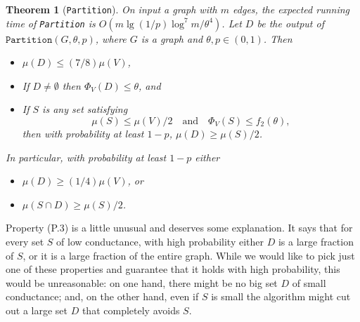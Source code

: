 \documentclass[11pt]{article}
\newtheorem{theorem}{Theorem}[section]
\def\intersect{\cap}
\def\intersect{\cap}
\def\conduc#1#2{\Phi_{#1}\left(#2  \right)}
\def\vol#1{\mu \left(#1  \right)}
\begin{document}
\begin{theorem}[\texttt{Partition}]\label{thm:Partition}
On input a graph with $m$ edges,
  the expected running time of \mbox{\rm \texttt{Partition}} is 
  $O \left(m \lg (1/p) \log^{7} m / \theta^{4} \right) $.
Let $D$ be the output of $\mathtt{Partition} (G, \theta , p)$,
  where $G$ is a graph and $\theta, p \in (0,1)$.
Then
\begin{itemize}
\item [(P.1)] $\vol{D} \leq (7/8) \vol{V}$,
\item [(P.2)] If $D \not = \emptyset$ then $\conduc{V}{D} \leq  \theta $, and
\item [(P.3)]
If $S$ is any
  set satisfying
\begin{equation}\label{eqn:P3}
\vol{S} \leq \vol{V}/2 \quad \text{and} \quad  \conduc{V}{S} \leq f_{2} (\theta),
\end{equation}
  then with probability at least $1-p$,
  $\vol{D} \geq \vol{S}/2$.
\end{itemize}
In particular, with probability at least $1-p$ either
\begin{itemize}
\item [(P.3.a)] $\vol{D} \geq (1/4) \vol{V}$, or
\item [(P.3.b)] $\vol{S \intersect D} \geq \vol{S}/2$.
\end{itemize}
\end{theorem}

Property (P.3) is a little unusual and deserves some explanation.
It says that for every set $S$ of low conductance, with high probability
  either
  $D$ is a large fraction of $S$, or it is a large fraction of the
  entire graph.
While we would like to pick just one of these properties and guarantee that
  it holds with high probability, this would be unreasonable:  
  on one hand, there might be no big set $D$ of small conductance;
  and, on the other hand, even if $S$ is small the algorithm might
  cut out a large set $D$ that completely avoids $S$.
\end{document}
